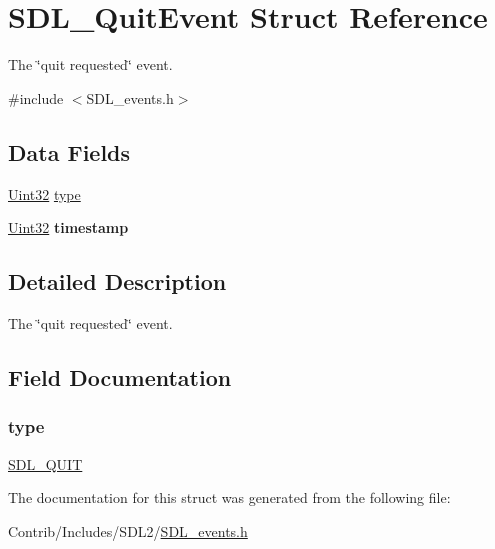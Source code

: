 \hypertarget{struct_s_d_l___quit_event}{}\section{S\+D\+L\+\_\+\+Quit\+Event Struct Reference}
\label{struct_s_d_l___quit_event}


The \char`\"{}quit requested\char`\"{} event.  




{\ttfamily \#include $<$S\+D\+L\+\_\+events.\+h$>$}

\subsection*{Data Fields}
\begin{DoxyCompactItemize}
\item 
\hyperlink{_s_d_l__stdinc_8h_add440eff171ea5f55cb00c4a9ab8672d}{Uint32} \hyperlink{struct_s_d_l___quit_event_aa40a9b05c3154032b9f2d7220e9f08dc}{type}
\item 
\hyperlink{_s_d_l__stdinc_8h_add440eff171ea5f55cb00c4a9ab8672d}{Uint32} {\bfseries timestamp}\hypertarget{struct_s_d_l___quit_event_abf1ed7edeab81db9c05d899836a44a2f}{}\label{struct_s_d_l___quit_event_abf1ed7edeab81db9c05d899836a44a2f}

\end{DoxyCompactItemize}


\subsection{Detailed Description}
The \char`\"{}quit requested\char`\"{} event. 

\subsection{Field Documentation}
\subsubsection[{\texorpdfstring{type}{type}}]{ type}\hypertarget{struct_s_d_l___quit_event_aa40a9b05c3154032b9f2d7220e9f08dc}{}\label{struct_s_d_l___quit_event_aa40a9b05c3154032b9f2d7220e9f08dc}
\hyperlink{_s_d_l__events_8h_a3b589e89be6b35c02e0dd34a55f3fccaa31acc5fdafc86ebe2c1f5c3cae48d603}{S\+D\+L\+\_\+\+Q\+U\+IT} 

The documentation for this struct was generated from the following file\+:\begin{DoxyCompactItemize}
\item 
Contrib/\+Includes/\+S\+D\+L2/\hyperlink{_s_d_l__events_8h}{S\+D\+L\+\_\+events.\+h}\end{DoxyCompactItemize}
